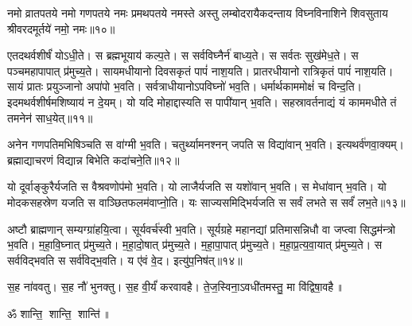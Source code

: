 \pagebreak[4]
नमो व्रातपतये नमो गणपतये नमः प्रमथपतये नमस्ते अस्तु लम्बोदरायैकदन्ताय विघ्नविनाशिने शिवसुताय श्रीवरदमू‍र्तये॑ नमो॒ नमः॥१०॥

एतदथर्वशीर्षं॑ योऽधी॒ते। स ब्रह्मभूयाय॑ कल्प॒ते।  स सर्वविघ्नैर्न॑ बाध्य॒ते।
स सर्वतः सुख॑मेध॒ते।  स पञ्चमहापापात् प्र॑मुच्य॒ते।
सायमधीयानो दिवसकृतं पापं॑ नाश॒यति।  प्रातरधीयानो रात्रिकृतं पापं॑ नाश॒यति।
सायं प्रातः प्रयुञ्जानो अपा॑पो भ॒वति।  सर्वत्राधीयानोऽपविघ्नो॑ भव॒ति।
धर्मार्थकाममोक्षं॑ च विन्द॒ति। इदमथर्वशीर्षमशिष्याय॑ न दे॒यम्।  यो यदि मोहाद्दास्यति स पापी॑यान् भ॒वति।
सहस्रावर्तनाद्यं यं काममधीते तं तमनेन॑ साध॒येत्॥११॥

अनेन गणपतिमभिषिञ्चति स वा॑ग्मी भ॒वति।  चतुर्थ्यामनश्नन् जपति स विद्या॑वान् भ॒वति।  इत्यथर्व॑णवा॒क्यम्। ब्रह्माद्याचरणं विद्यान्न बिभेति कदा॑चने॒ति॥१२॥

यो दूर्वाङ्कुरैर्यजति स वैश्रवणोप॑मो भ॒वति। यो लाजैर्यजति स यशो॑वान् भ॒वति। स मेधा॑वान् भ॒वति। 
यो मोदकसहस्रेण यजति स वाञ्छितफलम॑वाप्नो॒ति। यः साज्यसमिद्भिर्यजति स सर्वं लभते स सर्वं॑ लभ॒ते॥१३॥

अष्टौ ब्राह्मणान् सम्यग्ग्रा॑हयि॒त्वा। सूर्यवर्च॑स्वी भ॒वति।
सूर्यग्रहे महानद्यां प्रतिमासन्निधौ वा जप्त्वा सिद्धम॑न्त्रो भ॒वति।
म॒हा॒वि॒घ्नात् प्र॑मुच्य॒ते।  म॒हा॒दो॒षात् प्र॑मुच्य॒ते। म॒हा॒पा॒पात् प्र॑मुच्य॒ते।
म॒हा॒प्र॒त्य॒वा॒यात् प्र॑मुच्य॒ते। स सर्वविद्भवति स सर्व॑विद्भ॒वति।\linebreak
य ए॑वं वे॒द।  इत्यु॑प॒निष॑त्॥१४॥

स॒ह ना॑ववतु। स॒ह नौ॑ भुनक्तु। स॒ह वी॒र्यं॑ करवावहै।
ते॒ज॒स्विना॒ऽवधी॑तमस्तु॒ मा वि॑द्विषा॒वहै॥

\centerline{ॐ शान्ति॒ शान्ति॒ शान्ति॑॥}